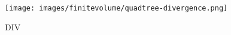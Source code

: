 \begin{figure}[ht]
    \centering
    \texttt{[image: images/finitevolume/quadtree-divergence.png]}
    \caption{DIV}
    \label{fig:finitevolume-quadtree-divergence}
\end{figure}
